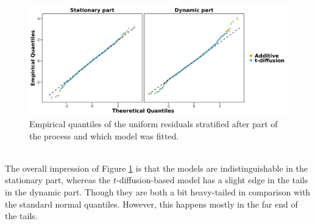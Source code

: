 \begin{figure}[h!]
\begin{center}
    \includegraphics[scale = .1]{figures/OU_vs_t_diffusion_QQ_plot.jpeg}
    \caption{Empirical quantiles of the uniform residuals stratified after part of the process and which model was fitted.}
    \label{figure:OU_t_diffusion_QQ_plot}
\end{center}
\end{figure}\\
The overall impression of Figure \ref{figure:OU_t_diffusion_QQ_plot} is that the models are indistinguishable in the stationary part, whereas the $t$-diffusion-based model has a slight edge in the tails in the dynamic part. Though they are both a bit heavy-tailed in comparison with the standard normal quantiles. However, this happens mostly in the far end of the tails. 

